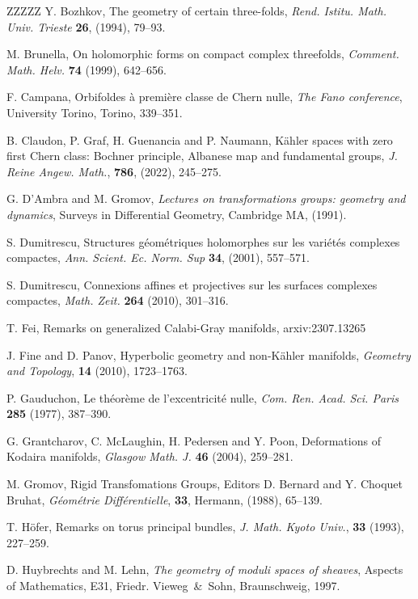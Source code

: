 \documentclass[12pt,reqno]{amsart}
\theoremstyle{definition}
\numberwithin{equation}{section}
\begin{document}
\begin{thebibliography}{ZZZZZ}
 Y. Bozhkov, The geometry of certain three-folds, {\it Rend. Istitu. Math. Univ. Trieste}
{\bf 26}, (1994), 79--93.

 M. Brunella, On holomorphic forms on compact complex threefolds, \textit{Comment. Math. 
Helv.} \textbf{74} (1999), 642--656.

 F. Campana, Orbifoldes \`a premi\`ere classe de Chern nulle, {\it The Fano conference}, 
University Torino, Torino, 339--351.

 B. Claudon, P. Graf, H. Guenancia and P. Naumann, K\"ahler spaces with zero first 
Chern class: Bochner principle, Albanese map and fundamental groups, {\it J. Reine Angew. Math.}, {\bf 
786}, (2022), 245--275.

 G. D'Ambra and M. Gromov, \textit{Lectures on transformations groups: geometry and 
dynamics}, Surveys in Differential Geometry, Cambridge MA, (1991).

 S. Dumitrescu, Structures g\'eom\'etriques holomorphes sur les vari\'et\'es complexes 
compactes, \textit{Ann. Scient. Ec. Norm. Sup} \textbf{34}, (2001), 557--571.

 S. Dumitrescu, Connexions affines et projectives sur les surfaces complexes compactes, 
{\it Math. Zeit.} {\bf 264} (2010), 301--316.

 T. Fei, Remarks on generalized Calabi-Gray manifolds, arxiv:2307.13265

 J. Fine and D. Panov, Hyperbolic geometry and non-K\"ahler manifolds, {\it Geometry and 
Topology}, {\bf 14} (2010), 1723--1763.

 P. Gauduchon, Le th\'eor\`eme de l'excentricit\'e nulle, \textit{Com. Ren. Acad. Sci. 
Paris} {\bf 285} (1977), 387--390.


 G. Grantcharov, C. McLaughin, H. Pedersen and Y. Poon, Deformations of Kodaira 
manifolds, {\it Glasgow Math. J.} {\bf 46} (2004), 259--281.

 M. Gromov, Rigid Transfomations Groups, Editors D. Bernard and Y. Choquet Bruhat, 
\textit{G\'eom\'etrie Diff\'erentielle}, \textbf{33}, Hermann, (1988), 65--139.

 T. H\"ofer, Remarks on torus principal bundles, {\it J. Math. Kyoto Univ.}, {\bf 33} 
(1993), 227--259.

 D. Huybrechts and M. Lehn, {\it The geometry of moduli spaces of sheaves}, Aspects of 
Mathematics, E31, Friedr. Vieweg~\&~Sohn, Braunschweig, 1997.


\end{thebibliography}
\end{document}

